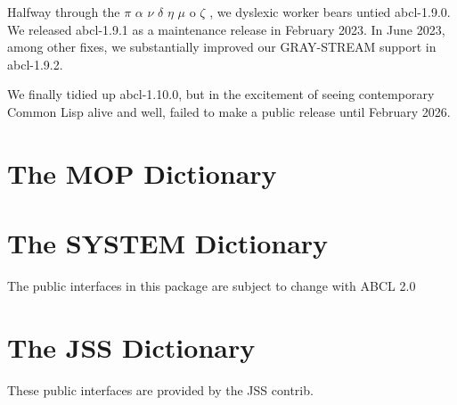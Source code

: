 \documentclass[10pt]{book}
\begin{document}
Halfway through the $\pi$ $\alpha$ $\nu$ $\delta$ $\eta$ $\mu$ o
$\zeta$ \cite{pandemos}, we dyslexic worker bears untied abcl-1.9.0.
We released abcl-1.9.1 as a maintenance release in February 2023.  In
June 2023, among other fixes, we substantially improved our
GRAY-STREAM support in abcl-1.9.2.

We finally tidied up abcl-1.10.0, but in the excitement of seeing
contemporary Common Lisp alive and well, failed to make a public
release until February 2026.

\appendix 

\chapter{The MOP Dictionary}



\chapter{The SYSTEM Dictionary}

The public interfaces in this package are subject to change with
\textsc{ABCL} 2.0



\chapter{The JSS Dictionary}

These public interfaces are provided by the JSS contrib.






\printindex
\end{document}
